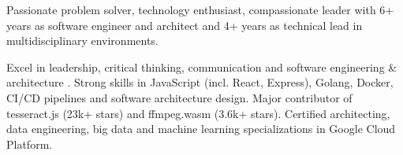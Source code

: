 

\begin{cvparagraph}

Passionate problem solver, technology enthusiast, compassionate leader with 6+ years as software engineer and architect and 4+ years as technical lead in multidisciplinary environments.

  Excel in leadership, critical thinking, communication and software engineering \& architecture . Strong skills in JavaScript (incl. React, Express), Golang, Docker, CI/CD pipelines and software architecture design. Major contributor of tesseract.js (23k+ stars) and ffmpeg.wasm (3.6k+ stars). Certified architecting, data engineering, big data and machine learning specializations in Google Cloud Platform. 
\end{cvparagraph}
